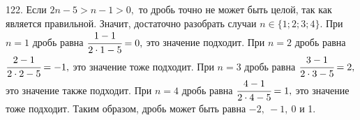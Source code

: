 122. Если $2n-5>n-1>0,$ то дробь точно не может быть целой, так как является правильной. Значит, достаточно разобрать случаи $n\in\{1; 2; 3; 4\}.$ При $n=1$ дробь равна $\cfrac{1-1}{2\cdot1-5}=0,$ это значение подходит. При $n=2$ дробь равна $\cfrac{2-1}{2\cdot2-5}=-1,$ это значение тоже подходит.
При $n=3$ дробь равна $\cfrac{3-1}{2\cdot3-5}=2,$ это значение также подходит. При $n=4$ дробь равна $\cfrac{4-1}{2\cdot4-5}=1,$ это значение тоже подходит. Таким образом, дробь может быть равна $-2,\ -1,\ 0$ и 1.\\
